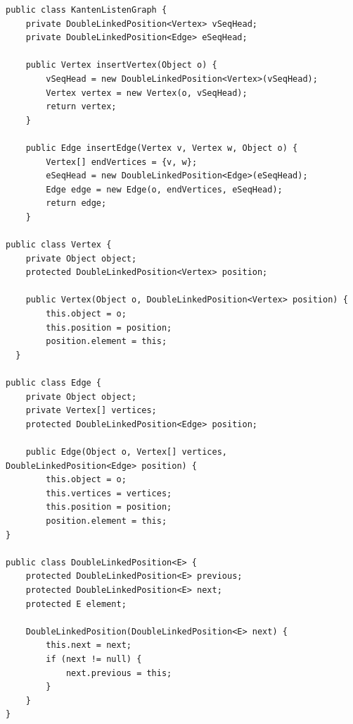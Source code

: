 \begin{lstlisting}
public class KantenListenGraph {
    private DoubleLinkedPosition<Vertex> vSeqHead;
    private DoubleLinkedPosition<Edge> eSeqHead;
    
    public Vertex insertVertex(Object o) {
        vSeqHead = new DoubleLinkedPosition<Vertex>(vSeqHead);
        Vertex vertex = new Vertex(o, vSeqHead);
        return vertex;
    }
    
    public Edge insertEdge(Vertex v, Vertex w, Object o) {
        Vertex[] endVertices = {v, w};
        eSeqHead = new DoubleLinkedPosition<Edge>(eSeqHead);
        Edge edge = new Edge(o, endVertices, eSeqHead);
        return edge;
    }

public class Vertex {
    private Object object;
    protected DoubleLinkedPosition<Vertex> position;
    
    public Vertex(Object o, DoubleLinkedPosition<Vertex> position) {
        this.object = o;
        this.position = position;
        position.element = this;
  }

public class Edge {
    private Object object;
    private Vertex[] vertices;
    protected DoubleLinkedPosition<Edge> position;
    
    public Edge(Object o, Vertex[] vertices, DoubleLinkedPosition<Edge> position) {
        this.object = o;
        this.vertices = vertices;
        this.position = position;
        position.element = this;
}

public class DoubleLinkedPosition<E> {
    protected DoubleLinkedPosition<E> previous;
    protected DoubleLinkedPosition<E> next;
    protected E element;
    
    DoubleLinkedPosition(DoubleLinkedPosition<E> next) {
        this.next = next;
        if (next != null) {
            next.previous = this;
        }
    }
}
\end{lstlisting}


\newpage